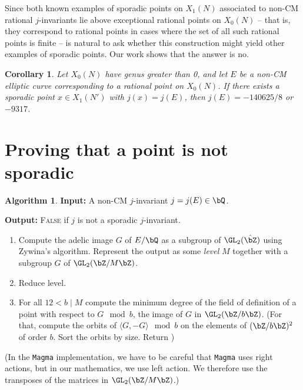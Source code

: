 \documentclass[11pt,reqno]{amsart}
\theoremstyle{plain}
\newtheorem{corollary}[theorem]{Corollary}
\theoremstyle{definition}
\newtheorem{algorithm}[theorem]{Algorithm}
\newcommand{\Q}{\bQ}
\newcommand{\Z}{\bZ}
\newcommand{\filip}[1]{{\color{cyan} \textsf{$\sun\sun\sun$ Filip: [#1]}}}
\begin{document}
Since both known examples of sporadic points on $X_1(N)$ associated to non-CM rational $j$-invariants lie above exceptional rational points on $X_0(N)$ -- that is, they correspond to rational points in cases where the set of all such rational points is finite -- is natural to ask whether this construction might yield other examples of sporadic points. Our work shows that the answer is no.
\begin{corollary}
Let $X_0(N)$ have genus greater than 0, and let $E$ be a non-CM elliptic curve corresponding to a rational point on $X_0(N)$. If there exists a sporadic point $x \in X_1(N')$ with $j(x)=j(E)$, then $j(E) =-140625/8$ or $-9317$.
\end{corollary}

\section{Proving that a point is not sporadic}

\begin{algorithm}
\textbf{Input:} A non-CM $j$-invariant $j = j(E) \in \Q$.

\textbf{Output:} \textsc{False} if $j$ is not a sporadic $j$-invariant.

\begin{enumerate}
    \item Compute the adelic image $G$ of $E/\Q$ as a subgroup of $\GL_2(\hat{\Z})$ using Zywina's algorithm. Represent the output as some \emph{level} $M$ together with a subgroup $G$ of $\GL_2(\Z/M\Z)$.

    \item Reduce level.

    \item For all $12 < b \mid M$ compute the minimum degree of the field of definition of a point with respect to $G \mod b$, the image of $G$ in $\GL_2(\Z/b\Z)$. (For that, compute the orbits of $\langle G, -G \rangle \mod b$ on the elements of $(\Z/b\Z)^2$ of order $b$. Sort the orbits by size. Return ) 
\end{enumerate}
\end{algorithm}

(In the \texttt{Magma} implementation, we have to be careful that \texttt{Magma} uses right actions, but in our mathematics, we use left action. We therefore use the transposes of the matrices in $\GL_2(\Z/M\Z)$.)
\end{document}
